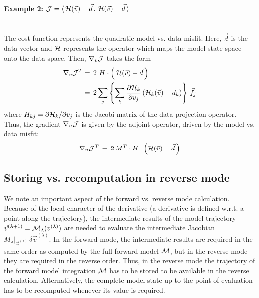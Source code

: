 \paragraph{Example 2: 
$ {\cal J} = \langle \, {\cal H}(\vec{v}) - \vec{d} \, , 
 \, {\cal H}(\vec{v}) - \vec{d} \, \rangle $} ~ \\
The cost function represents the quadratic model vs. data misfit.
Here, $ \vec{d} $ is the data vector and $ {\cal H} $ represents the
operator which maps the model state space onto the data space.
Then, $ \nabla_v {\cal J} $ takes the form
%
\begin{equation*}
\begin{split}
\nabla_v {\cal J}^T & = \, 2 \, \, H \cdot 
\left( \, {\cal H}(\vec{v}) - \vec{d} \, \right) \\
~          & = \, 2 \sum_{j} \left\{ \sum_k
\frac{\partial {\cal H}_k}{\partial v_{j}} 
\left( {\cal H}_k (\vec{v}) - d_k \right)
\right\} \, {\vec{f}_{j}} \\
\end{split}
\end{equation*}
%
where $H_{kj} = \partial {\cal H}_k / \partial v_{j} $ is the 
Jacobi matrix of the data projection operator.
Thus, the gradient $ \nabla_u {\cal J} $ is given by the 
adjoint operator,
driven by the model vs. data misfit:
\[
\nabla_u {\cal J}^T \, = \, 2 \, M^T \cdot 
H \cdot \left( {\cal H}(\vec{v}) - \vec{d} \, \right)
\]

\subsection{Storing vs. recomputation in reverse mode}
\label{checkpointing}

We note an important aspect of the forward vs. reverse 
mode calculation.
Because of the local character of the derivative
(a derivative is defined w.r.t. a point along the trajectory),
the intermediate results of the model trajectory
$\vec{v}^{(\lambda+1)}={\cal M}_{\lambda}(v^{(\lambda)})$ 
are needed to evaluate the intermediate Jacobian 
$M_{\lambda}|_{\vec{v}^{(\lambda)}} \, \delta \vec{v}^{(\lambda)} $.
In the forward mode, the intermediate results are required
in the same order as computed by the full forward model ${\cal M}$,
but in the reverse mode they are required in the reverse order.
Thus, in the reverse mode the trajectory of the forward model
integration ${\cal M}$ has to be stored to be available in the reverse
calculation. Alternatively, the complete model state up to the
point of evaluation has to be recomputed whenever its value is required.

